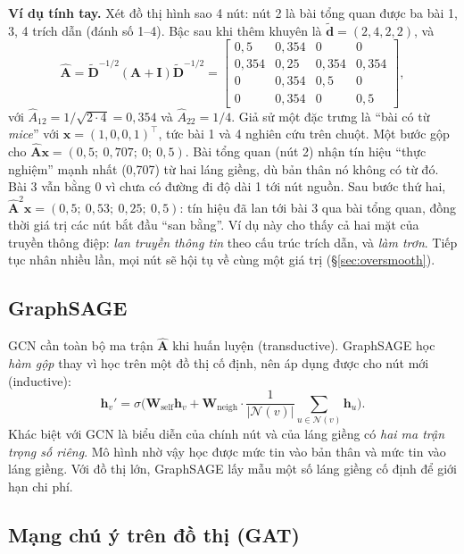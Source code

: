 \textbf{Ví dụ tính tay.} Xét đồ thị hình sao 4 nút: nút 2 là bài tổng quan được ba bài 1, 3, 4 trích dẫn (đánh số 1–4). Bậc sau khi thêm khuyên là $\tilde{\mathbf d} = (2, 4, 2, 2)$, và
\[
\hat{\mathbf A} = \tilde{\mathbf D}^{-1/2}(\mathbf A+\mathbf I)\tilde{\mathbf D}^{-1/2} =
\begin{bmatrix} 0{,}5 & 0{,}354 & 0 & 0\\ 0{,}354 & 0{,}25 & 0{,}354 & 0{,}354\\ 0 & 0{,}354 & 0{,}5 & 0\\ 0 & 0{,}354 & 0 & 0{,}5\end{bmatrix},
\]
với $\hat A_{12} = 1/\sqrt{2\cdot4} = 0{,}354$ và $\hat A_{22} = 1/4$. Giả sử một đặc trưng là ``bài có từ \emph{mice}'' với $\mathbf x = (1, 0, 0, 1)^\top$, tức bài 1 và 4 nghiên cứu trên chuột. Một bước gộp cho $\hat{\mathbf A}\mathbf x = (0{,}5;\ 0{,}707;\ 0;\ 0{,}5)$. Bài tổng quan (nút 2) nhận tín hiệu ``thực nghiệm'' mạnh nhất (0,707) từ hai láng giềng, dù bản thân nó không có từ đó. Bài 3 vẫn bằng 0 vì chưa có đường đi độ dài 1 tới nút nguồn. Sau bước thứ hai, $\hat{\mathbf A}^2\mathbf x = (0{,}5;\ 0{,}53;\ 0{,}25;\ 0{,}5)$: tín hiệu đã lan tới bài 3 qua bài tổng quan, đồng thời giá trị các nút bắt đầu ``san bằng''. Ví dụ này cho thấy cả hai mặt của truyền thông điệp: \emph{lan truyền thông tin} theo cấu trúc trích dẫn, và \emph{làm trơn}. Tiếp tục nhân nhiều lần, mọi nút sẽ hội tụ về cùng một giá trị (\S\ref{sec:oversmooth}).

\subsection{GraphSAGE}

GCN cần toàn bộ ma trận $\hat{\mathbf A}$ khi huấn luyện (transductive). GraphSAGE \cite{hamilton2017} học \emph{hàm gộp} thay vì học trên một đồ thị cố định, nên áp dụng được cho nút mới (inductive):
\begin{equation}
\mathbf h_v' = \sigma\Big(\mathbf W_{\text{self}}\mathbf h_v + \mathbf W_{\text{neigh}}\cdot\frac{1}{|\mathcal N(v)|}\sum_{u\in\mathcal N(v)}\mathbf h_u\Big).
\label{eq:sage}
\end{equation}
Khác biệt với GCN là biểu diễn của chính nút và của láng giềng có \emph{hai ma trận trọng số riêng}. Mô hình nhờ vậy học được mức tin vào bản thân và mức tin vào láng giềng. Với đồ thị lớn, GraphSAGE lấy mẫu một số láng giềng cố định để giới hạn chi phí.

\subsection{Mạng chú ý trên đồ thị (GAT)}

